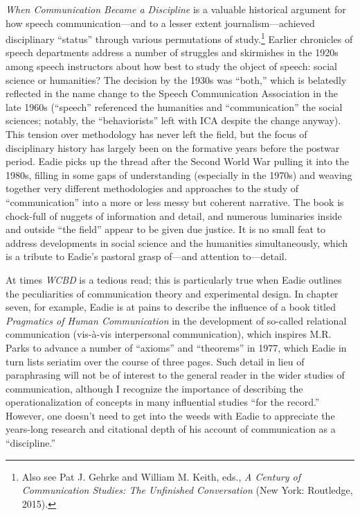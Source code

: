 \documentclass{tufte-handout}
\begin{document}
\emph{When Communication Became a Discipline} is a valuable historical
argument for how speech communication---and to a lesser extent
journalism---achieved disciplinary ``status'' through various
permutations of study.\footnote{Also see Pat J. Gehrke and William M.
  Keith, eds., \emph{A Century of Communication Studies: The Unfinished
  Conversation} (New York: Routledge, 2015).} Earlier chronicles of
speech departments address a number of struggles and skirmishes in the
1920s among speech instructors about how best to study the object of
speech: social science or humanities? The decision by the 1930s was
``both,'' which is belatedly reflected in the name change to the Speech
Communication Association in the late 1960s (``speech'' referenced the
humanities and ``communication'' the social sciences; notably, the
``behaviorists'' left with ICA despite the change anyway). This tension
over methodology has never left the field, but the focus of disciplinary
history has largely been on the formative years before the postwar
period. Eadie picks up the thread after the Second World War pulling it
into the 1980s, filling in some gaps of understanding (especially in the
1970s) and weaving together very different methodologies and approaches
to the study of ``communication'' into a more or less messy but coherent
narrative. The book is chock-full of nuggets of information and detail,
and numerous luminaries inside and outside ``the field'' appear to be
given due justice. It is no small feat to address developments in social
science and the humanities simultaneously, which is a tribute to Eadie's
pastoral grasp of---and attention to---detail.

At times \emph{WCBD} is a tedious read; this is particularly true when
Eadie outlines the peculiarities of communication theory and
experimental design. In chapter seven, for example, Eadie is at pains to
describe the influence of a book titled \emph{Pragmatics of Human
Communication} in the development of so-called relational communication
(vis-à-vis interpersonal communication), which inspires M.R. Parks to
advance a number of ``axioms'' and ``theorems'' in 1977, which Eadie in
turn lists seriatim over the course of three pages. Such detail in lieu
of paraphrasing will not be of interest to the general reader in the
wider studies of communication, although I recognize the importance of
describing the operationalization of concepts in many influential
studies ``for the record.'' However, one doesn't need to get into the
weeds with Eadie to appreciate the years-long research and citational
depth of his account of communication as a ``discipline.''
\end{document}
